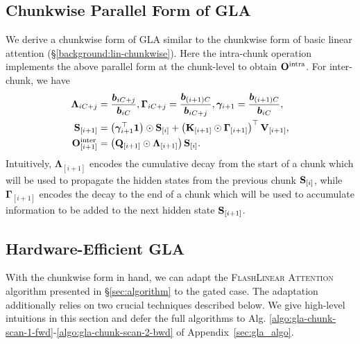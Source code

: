 




\vspace{-2mm}
\subsection{Chunkwise Parallel Form of GLA}
\vspace{-2mm}
We derive a chunkwise form of GLA similar to the chunkwise form of basic linear attention (\S\ref{background:lin-chunkwise}). Here the intra-chunk operation implements the above parallel form at the chunk-level to obtain ${\mathbf{O}}^{\text{intra}}$. For inter-chunk, we have
\begin{align*}
\mathbf{\Lambda}_{iC+j} &= \frac{{\bm{b}}_{iC+j}}{{\bm{b}}_{iC}},  \mathbf{\Gamma}_{iC+j} = \frac{{\bm{b}}_{(i+1)C}}{{\bm{b}}_{iC+j}}, 
{\bm{\gamma}}_{i+1} = \frac{{\bm{b}}_{(i+1)C}}{{\bm{b}}_{iC}},  
 \\
{\mathbf{S}}_{[i+1]} &= \left({\bm{\gamma}}_{i+1}^{\top}\mathbf{1}\right)  \odot {\mathbf{S}}_{[i]} + \left({\mathbf{K}}_{[i+1]} \odot \mathbf \Gamma_{[i+1]} \right)^{\top}
{\mathbf{V}}_{[i+1]},  \\
{\mathbf{O}}^{\text{inter}}_{[i+1]} &= \left({\mathbf{Q}}_{[i+1]} \odot \mathbf \Lambda_{[i+1]}\right) {\mathbf{S}}_{[i]}. 
\end{align*}
Intuitively, $\mathbf \Lambda_{[i+1]} $ encodes the cumulative decay from the start of a chunk which will be used to propagate the hidden states from the previous chunk ${\mathbf{S}}_{[i]}$, while   $\mathbf \Gamma_{[i+1]}$ encodes the decay to the end of a chunk which will be used to accumulate information to be added to the next hidden state ${\mathbf{S}}_{[i+1]}$.
\vspace{-2mm}
\subsection{Hardware-Efficient GLA}
\vspace{-2mm}
\label{subsec:flash-gla}
With the chunkwise form in hand, we can adapt the \textsc{FlashLinear Attention} algorithm presented in \S\ref{sec:algorithm} to the gated case. The adaptation additionally relies on two crucial techniques described below. 
We give high-level intuitions in this section
and defer the full algorithms to Alg. \ref{algo:gla-chunk-scan-1-fwd}-\ref{algo:gla-chunk-scan-2-bwd} of Appendix~\ref{sec:gla_algo}.

\vspace{-2mm}

